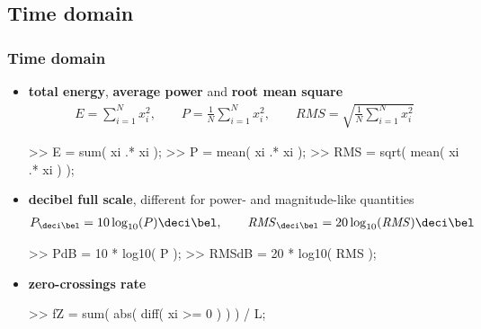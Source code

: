 
\subsection{Time domain}

\begin{frame}[fragile]
	\frametitle{Time domain}
	\begin{itemize}
		\item \textbf{total energy}, \textbf{average power} and \textbf{root mean square}
			\begin{align*}
				E=\sum_{i=1}^Nx_i^2,\qquad P=\frac1N\sum_{i=1}^Nx_i^2,\qquad\mathit{RMS}=\sqrt{\frac1N\sum_{i=1}^Nx_i^2}
			\end{align*}
			\begin{code}
>> E = sum( xi .* xi );
>> P = mean( xi .* xi );
>> RMS = sqrt( mean( xi .* xi ) );
			\end{code}
		\item \textbf{decibel full scale}, different for power- and magnitude-like quantities
			\begin{align*}
				P_{\deci\bel}=10\log_{10}(P)\deci\bel,\qquad\mathit{RMS}_{\deci\bel}=20\log_{10}(\mathit{RMS})\deci\bel
			\end{align*}
			\begin{code}
>> PdB = 10 * log10( P );
>> RMSdB = 20 * log10( RMS );
			\end{code}
		\item \textbf{zero-crossings rate}
			\begin{code}
>> fZ = sum( abs( diff( xi >= 0 ) ) ) / L;
			\end{code}
	\end{itemize}
\end{frame}

